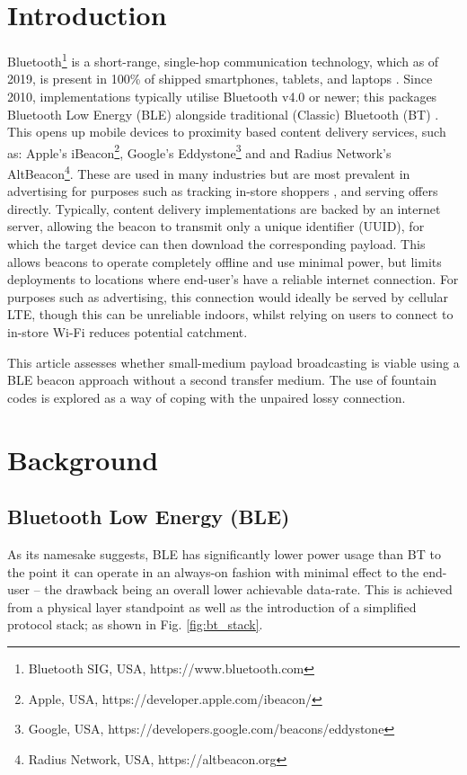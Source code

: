 \documentclass[conference]{IEEEtran} %
\begin{document}
\section{Introduction}
Bluetooth\footnote{Bluetooth SIG, USA, https://www.bluetooth.com} is a short-range, single-hop communication technology, which as of 2019, is present in 100\% of shipped smartphones, tablets, and laptops \cite{BT:MARKET_RESEARCH}. Since 2010, implementations typically utilise Bluetooth v4.0 or newer; this packages Bluetooth Low Energy (BLE) alongside traditional (Classic) Bluetooth (BT) \cite{BT:CORE_SPEC}. This opens up mobile devices to proximity based content delivery services, such as: Apple's iBeacon\footnote{Apple, USA, https://developer.apple.com/ibeacon/}, Google's Eddystone\footnote{Google, USA, https://developers.google.com/beacons/eddystone} and and Radius Network's AltBeacon\footnote{Radius Network, USA, https://altbeacon.org}. These are used in many industries but are most prevalent in advertising for purposes such as tracking in-store shoppers \cite{BT:TRACK_USE_CASE}, and serving offers directly. Typically, content delivery implementations are backed by an internet server, allowing the beacon to transmit only a unique identifier (UUID), for which the target device can then download the corresponding payload. This allows beacons to operate completely offline and use minimal power, but limits deployments to locations where end-user's have a reliable internet connection. For purposes such as advertising, this connection would ideally be served by cellular LTE, though this can be unreliable indoors, whilst relying on users to connect to in-store Wi-Fi reduces potential catchment.

This article assesses whether small-medium payload broadcasting is viable using a BLE beacon approach without a second transfer medium. The use of fountain codes is explored as a way of coping with the unpaired lossy connection. 

\section{Background}
\subsection{Bluetooth Low Energy (BLE)}
As its namesake suggests, BLE has significantly lower power usage than BT to the point it can operate in an always-on fashion with minimal effect to the end-user -- the drawback being an overall lower achievable data-rate. This is achieved from a physical layer standpoint as well as the introduction of a simplified protocol stack; as shown in Fig. \ref{fig:bt_stack}. 
\end{document}

